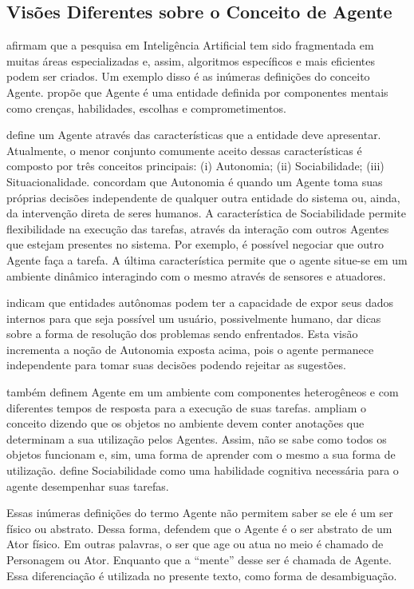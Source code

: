 \subsection{Visões Diferentes sobre o Conceito de Agente} \label{sec:aopca}

\citet{laird2001human} afirmam que a pesquisa em Inteligência Artificial tem
sido fragmentada em muitas áreas especializadas e, assim, algoritmos
específicos e mais eficientes podem ser criados. Um exemplo disso é as
inúmeras definições do conceito Agente. \citet{shoham1993agent}
propõe que Agente é uma entidade definida por componentes mentais como
crenças, habilidades, escolhas e comprometimentos.

\citet{franklin1997agent} define um Agente através das características que a
entidade deve apresentar.  Atualmente, o menor conjunto comumente aceito
dessas características é composto por três conceitos principais: (i)
Autonomia; (ii) Sociabilidade; (iii) Situacionalidade.
\citet{roadmap} concordam que Autonomia é quando um Agente
toma suas próprias decisões independente de qualquer outra entidade do sistema
ou, ainda, da intervenção direta de seres humanos. A característica de
Sociabilidade permite flexibilidade na execução das tarefas, através da
interação com outros Agentes que estejam presentes no sistema. Por exemplo, é
possível negociar que outro Agente faça a tarefa. A última característica
permite que o agente situe-se em um ambiente dinâmico interagindo com o mesmo
através de sensores e atuadores.

\citet{ingrand1992architecture} indicam que entidades autônomas podem ter a
capacidade de expor seus dados internos para que seja possível um usuário,
possivelmente humano, dar dicas sobre a forma de resolução dos problemas sendo
enfrentados. Esta visão incrementa a noção de Autonomia exposta acima,
pois o agente permanece independente para tomar suas decisões podendo rejeitar
as sugestões.

 também definem Agente em um ambiente com
componentes heterogêneos e com diferentes tempos de resposta para a execução
de suas tarefas. \citet{doyle1998annotated} ampliam o conceito dizendo que os
objetos no ambiente devem conter anotações que determinam a sua utilização
pelos Agentes. Assim, não se sabe como todos os objetos funcionam e, sim, uma
forma de aprender com o mesmo a sua forma de utilização.
\citet{shoham1993agent} define Sociabilidade como uma habilidade cognitiva
necessária para o agente desempenhar suas tarefas.

Essas inúmeras definições do termo Agente não permitem saber se ele é um ser
físico ou abstrato. Dessa forma, \citet{nareyek2001review,damiano2008emotions}
defendem que o Agente é o ser abstrato de um Ator físico. Em outras palavras,
o ser que age ou atua no meio é chamado de Personagem ou Ator. Enquanto que a
``mente'' desse ser é chamada de Agente. Essa diferenciação é utilizada no
presente texto, como forma de desambiguação.
